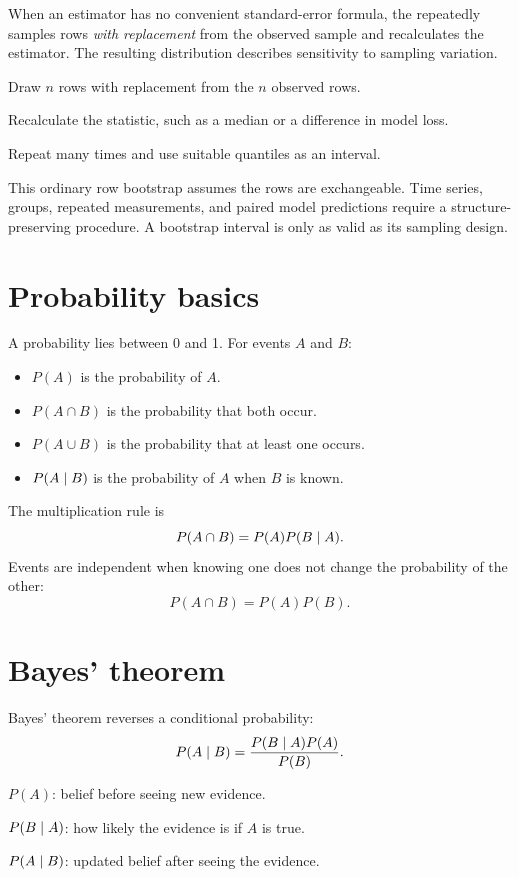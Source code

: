When an estimator has no convenient standard-error formula, the  repeatedly samples rows \emph{with replacement} from the observed sample and recalculates the estimator. The resulting distribution describes sensitivity to sampling variation.

\begin{mlsteps}
  \item Draw $n$ rows with replacement from the $n$ observed rows.
  \item Recalculate the statistic, such as a median or a difference in model loss.
  \item Repeat many times and use suitable quantiles as an interval.
\end{mlsteps}

This ordinary row bootstrap assumes the rows are exchangeable. Time series, groups, repeated measurements, and paired model predictions require a structure-preserving procedure. A bootstrap interval is only as valid as its sampling design.

\section{Probability basics}

A probability lies between 0 and 1. For events $A$ and $B$:

\begin{itemize}
  \item $P(A)$ is the probability of $A$.
  \item $P(A\cap B)$ is the probability that both occur.
  \item $P(A\cup B)$ is the probability that at least one occurs.
  \item $P(A\mathrel{|} B)$ is the probability of $A$ when $B$ is known.
\end{itemize}

The multiplication rule is
\[
  P(A\cap B)=P(A)P(B\mathrel{|} A).
\]
Events are independent when knowing one does not change the probability of the other:
\[
  P(A\cap B)=P(A)P(B).
\]

\section{Bayes' theorem}

Bayes' theorem reverses a conditional probability:
\[
  P(A\mathrel{|} B)=\frac{P(B\mathrel{|} A)P(A)}{P(B)}.
\]

\begin{description}[leftmargin=1.15in,style=nextline]
  \item[Prior] $P(A)$: belief before seeing new evidence.
  \item[Likelihood] $P(B\mathrel{|} A)$: how likely the evidence is if $A$ is true.
  \item[Posterior] $P(A\mathrel{|} B)$: updated belief after seeing the evidence.
\end{description}

